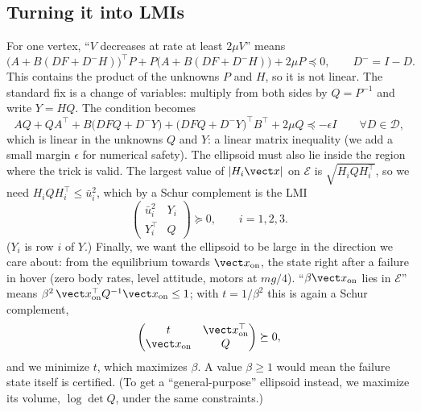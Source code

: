 \subsection{Turning it into LMIs}
For one vertex, ``$V$ decreases at rate at least $2\mu V$'' means
\begin{equation}
  \big(A + B(DF + D^-H)\big)^\top P + P\big(A + B(DF + D^-H)\big) + 2\mu P \preceq 0, \qquad D^- = I - D .
\end{equation}
This contains the product of the unknowns $P$ and $H$, so it is not linear. The standard fix is a change of variables: multiply from both sides by $Q = P^{-1}$ and write $Y = HQ$. The condition becomes
\begin{equation}\label{eq:lmi1}
  AQ + QA^\top + B\big(DFQ + D^-Y\big) + \big(DFQ + D^-Y\big)^\top B^\top + 2\mu Q \preceq -\epsilon I \qquad \forall D\in\mathcal D,
\end{equation}
which is linear in the unknowns $Q$ and $Y$: a linear matrix inequality (we add a small margin $\epsilon$ for numerical safety). The ellipsoid must also lie inside the region where the trick is valid. The largest value of $|H_i\vect x|$ on $\mathcal E$ is $\sqrt{H_iQH_i^\top}$, so we need $H_iQH_i^\top \le \bar u_i^2$, which by a Schur complement is the LMI
\begin{equation}\label{eq:lmi2}
  \begin{pmatrix} \bar u_i^2 & Y_i \\ Y_i^\top & Q \end{pmatrix} \succeq 0, \qquad i = 1, 2, 3 .
\end{equation}
($Y_i$ is row $i$ of $Y$.) Finally, we want the ellipsoid to be large in the direction we care about: from the equilibrium towards $\vect x_{\text{on}}$, the state right after a failure in hover (zero body rates, level attitude, motors at $mg/4$). ``$\beta\vect x_{\text{on}}$ lies in $\mathcal E$'' means $\beta^2\,\vect x_{\text{on}}^\top Q^{-1}\vect x_{\text{on}}\le1$; with $t = 1/\beta^2$ this is again a Schur complement,
\begin{equation}
  \begin{pmatrix} t & \vect x_{\text{on}}^\top \\ \vect x_{\text{on}} & Q\end{pmatrix}\succeq 0,
\end{equation}
and we minimize $t$, which maximizes $\beta$. A value $\beta\ge1$ would mean the failure state itself is certified. (To get a ``general-purpose'' ellipsoid instead, we maximize its volume, $\log\det Q$, under the same constraints.)

